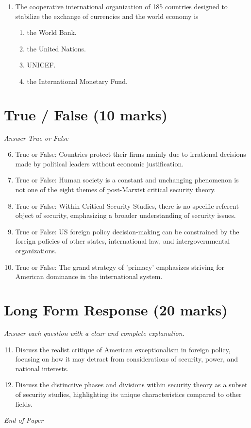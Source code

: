 \documentclass[12pt]{article}
\begin{document}
\begin{enumerate}[label=\arabic*.]
\begin{enumerate}[label=(\alph*)]
    \item It doesn't - the two are fundamentally opposed
    \item Both can be viewed as different means of achieving the same liberal ends
\end{enumerate}
\item The cooperative international organization of 185 countries designed to stabilize the exchange of currencies and the world economy is
\begin{enumerate}[label=(\alph*)]
    \item the World Bank.
    \item the United Nations.
    \item UNICEF.
    \item the International Monetary Fund.
\end{enumerate}
\end{enumerate}

\section*{True / False (10 marks)}
\textit{Answer True or False}
\begin{enumerate}[label=\arabic*.]
\setcounter{enumi}{5}
\item True or False: Countries protect their firms mainly due to irrational decisions made by political leaders without economic justification.
\item True or False: Human society is a constant and unchanging phenomenon is not one of the eight themes of post-Marxist critical security theory.
\item True or False: Within Critical Security Studies, there is no specific referent object of security, emphasizing a broader understanding of security issues.
\item True or False: US foreign policy decision-making can be constrained by the foreign policies of other states, international law, and intergovernmental organizations.
\item True or False: The grand strategy of 'primacy' emphasizes striving for American dominance in the international system.
\end{enumerate}

\section*{Long Form Response (20 marks)}
\textit{Answer each question with a clear and complete explanation.}
\begin{enumerate}[label=\arabic*.]
\setcounter{enumi}{10}
\item Discuss the realist critique of American exceptionalism in foreign policy, focusing on how it may detract from considerations of security, power, and national interests.
\item Discuss the distinctive phases and divisions within security theory as a subset of security studies, highlighting its unique characteristics compared to other fields.
\end{enumerate}

\vfill
\noindent\textit{End of Paper}
\end{document}
